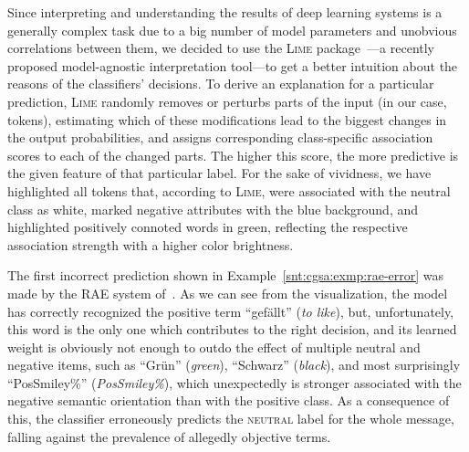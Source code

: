Since interpreting and understanding the results of deep learning
systems is a generally complex task due to a big number of model
parameters and unobvious correlations between them, we decided to use
the \textsc{Lime} package~\cite{Ribeiro:16}---a recently proposed
model-agnostic interpretation tool---to get a better intuition about
the reasons of the classifiers' decisions.  To derive an explanation
for a particular prediction, \textsc{Lime} randomly removes or
perturbs parts of the input (in our case, tokens), estimating which of
these modifications lead to the biggest changes in the output
probabilities, and assigns corresponding class-specific association
scores to each of the changed parts.  The higher this score, the more
predictive is the given feature of that particular label.  For the
sake of vividness, we have highlighted all tokens that, according to
\textsc{Lime}, were associated with the neutral class as white, marked
negative attributes with the \colorbox{blue!30}{blue} background, and
highlighted positively connoted words in \colorbox{green!30}{green},
reflecting the respective association strength with a higher color
brightness.

The first incorrect prediction shown in
Example~\ref{snt:cgsa:exmp:rae-error} was made by the RAE system
of~\citet{Socher:11}.  As we can see from the visualization, the model
has correctly recognized the positive term ``gef\"allt'' (\emph{to
  like}), but, unfortunately, this word is the only one which
contributes to the right decision, and its learned weight is obviously
not enough to outdo the effect of multiple neutral and negative items,
such as ``Gr\"un'' (\emph{green}), ``Schwarz'' (\emph{black}), and
most surprisingly ``PosSmiley\%'' (\emph{PosSmiley\%}), which
unexpectedly is stronger associated with the negative semantic
orientation than with the positive class.  As a consequence of this,
the classifier erroneously predicts the \textsc{neutral} label for the
whole message, falling against the prevalence of allegedly objective
terms.

